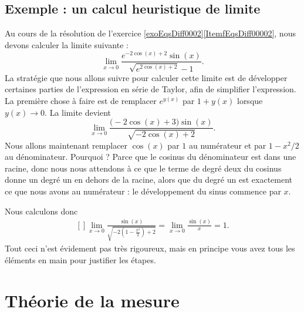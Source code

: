 					\subsection{Exemple : un calcul heuristique de limite}
\label{SubSecCalcLimHeuris}

Au cours de la résolution de l'exercice \ref{exoEqsDiff0002}\ref{ItemfEqsDiff00002}, nous devons calculer la limite suivante :
\begin{equation}
	\lim_{x\to 0} \frac{  e^{-2\cos(x)+2}\sin(x) }{ \sqrt{ e^{2\cos(x)+2}}-1 }.
\end{equation}
La stratégie que nous allons suivre pour calculer cette limite est de développer certaines parties de l'expression en série de Taylor, afin de simplifier l'expression. La première chose à faire est de remplacer $ e^{y(x)}$ par $1+y(x)$ lorsque $y(x)\to 0$. La limite devient
\begin{equation}
	\lim_{x\to 0} \frac{ \big( -2\cos(x)+3 \big)\sin(x) }{ \sqrt{-2\cos(x)+2} }.
\end{equation}
Nous allons maintenant remplacer $\cos(x)$ par $1$ au numérateur et par $1-x^2/2$ au dénominateur. Pourquoi ? Parce que le cosinus du dénominateur est dans une racine, donc nous nous attendons à ce que le terme de degré deux du cosinus donne un degré un en dehors de la racine, alors que du degré un est exactement ce que nous avons au numérateur : le développement du sinus commence par $x$.

Nous calculons donc
\begin{equation}
	\begin{aligned}[]
		\lim_{x\to 0} \frac{ \sin(x) }{ \sqrt{-2\left( 1-\frac{ x^2 }{ 2 } \right)+2} }=\lim_{x\to 0} \frac{ \sin(x) }{ x }=1.
	\end{aligned}
\end{equation}
Tout ceci n'est évidement pas très rigoureux, mais en principe vous avez tous les éléments en main pour justifier les étapes.

\section{Théorie de la mesure}


